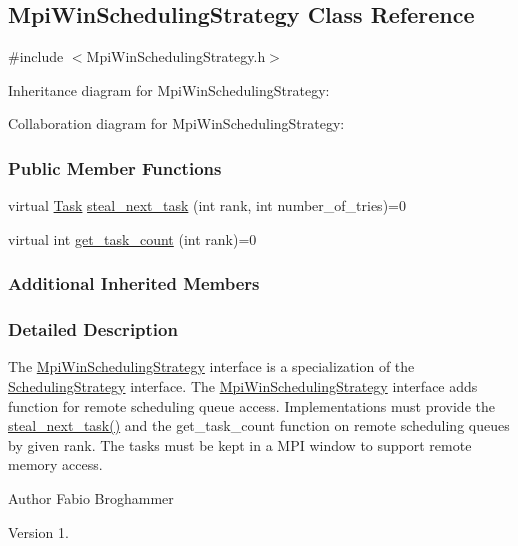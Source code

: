 \hypertarget{a00031}{}\subsection{Mpi\+Win\+Scheduling\+Strategy Class Reference}
\label{a00031}


{\ttfamily \#include $<$Mpi\+Win\+Scheduling\+Strategy.\+h$>$}



Inheritance diagram for Mpi\+Win\+Scheduling\+Strategy\+:


Collaboration diagram for Mpi\+Win\+Scheduling\+Strategy\+:
\subsubsection*{Public Member Functions}
\begin{DoxyCompactItemize}
\item 
virtual \hyperlink{a00002}{Task} \hyperlink{a00031_ac1804574e61c9ed91c7f78bc48b332ea}{steal\+\_\+next\+\_\+task} (int rank, int number\+\_\+of\+\_\+tries)=0
\item 
virtual int \hyperlink{a00031_a8742d0d3a2204efe5aa47e39f856dee1}{get\+\_\+task\+\_\+count} (int rank)=0
\end{DoxyCompactItemize}
\subsubsection*{Additional Inherited Members}


\subsubsection{Detailed Description}
The \hyperlink{a00031}{Mpi\+Win\+Scheduling\+Strategy} interface is a specialization of the \hyperlink{a00033}{Scheduling\+Strategy} interface. The \hyperlink{a00031}{Mpi\+Win\+Scheduling\+Strategy} interface adds function for remote scheduling queue access. Implementations must provide the \hyperlink{a00031_ac1804574e61c9ed91c7f78bc48b332ea}{steal\+\_\+next\+\_\+task()} and the get\+\_\+task\+\_\+count function on remote scheduling queues by given rank. The tasks must be kept in a M\+P\+I window to support remote memory access.

\begin{DoxyAuthor}{Author}
Fabio Broghammer 
\end{DoxyAuthor}
\begin{DoxyVersion}{Version}
1. 
\end{DoxyVersion}


